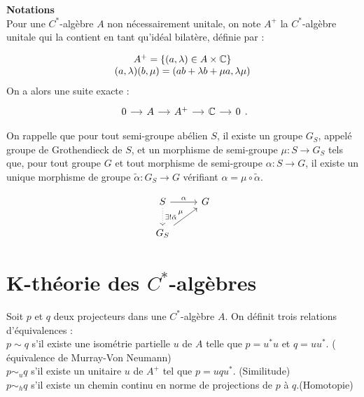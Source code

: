 \textbf{Notations}\\
Pour une $C^*$-algèbre $A$ non nécessairement unitale, on note $A^+$ la $C^*$-algèbre unitale qui la contient en tant qu'idéal bilatère, définie par :

\[\begin{array}{c}A^+=\{(a,\lambda)\in A\times \mathbb C \} \\ (a,\lambda)(b,\mu)=(ab+\lambda b +\mu a,\lambda\mu)\end{array}\]
 On a alors une suite exacte :
\[\begin{tikzcd}[column sep = small] 0 \arrow{r} &  A \arrow{r} & A^+ \arrow{r} & \C \arrow{r} & 0 \end{tikzcd}.\]

On rappelle que pour tout semi-groupe abélien $S$, il existe un groupe $G_S$, appelé groupe de Grothendieck de $S$, et un morphisme de semi-groupe $\mu : S\rightarrow G_S$ tels que, pour tout groupe $G$ et tout morphisme de semi-groupe $\alpha : S\rightarrow G$, il existe un unique morphisme de groupe $\tilde \alpha : G_S \rightarrow G$ vérifiant $\alpha = \mu \circ \tilde\alpha$. 

\[\begin{tikzcd} S \arrow{r}{\alpha} \arrow[dotted]{d}{\exists !\tilde\alpha}& G \\
	G_S \arrow{ur}{\mu} & \end{tikzcd}\]


\section{K-théorie des $C^*$-algèbres}

 
\begin{definition}
Soit $p$ et $q$ deux projecteurs dans une $C^*$-algèbre $A$. On définit trois relations d'équivalences :\\
$p\sim q$ s'il existe une isométrie partielle $u$ de $A$ telle que $p=u^*u $ et $q=uu^*$. ( équivalence de Murray-Von Neumann)\\
$p\sim_u q$ s'il existe un unitaire $u$ de $A^+$ tel que $p=uqu^*$. (Similitude)\\
$p\sim_h q$ s'il existe un chemin continu en norme de projections de $p$ à $q$.(Homotopie)\\
\end{definition}

